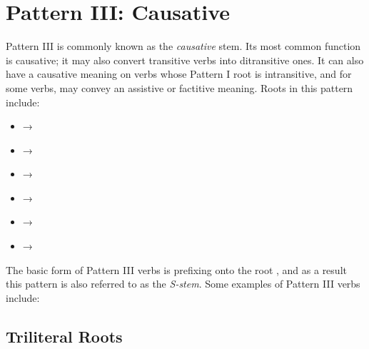 \documentclass[grammar]{subfiles}
\begin{document}

\clearpage
\section{Pattern III: Causative}
\label{sec:vm:pattern_iii}

Pattern III is commonly known as the \emph{causative} stem.  Its most common
function is causative; it may also convert transitive verbs into ditransitive
ones.  It can also have a causative meaning on verbs whose Pattern I root is
intransitive, and for some verbs, may convey an assistive or factitive meaning.
Roots in this pattern include: 

\begin{itemize}
  \item {} → 
  \item {} → 
  \item {} → 
  \item {} → 
  \item {} → 
  \item {} → 
\end{itemize}


The basic form of Pattern III verbs is prefixing  onto the root
, and as a result this pattern is also referred to as the
\emph{S-stem}.  Some examples of Pattern III verbs include:

\subsection{Triliteral Roots}
\label{ssec:vm:iii_triliteral}
\end{document}
